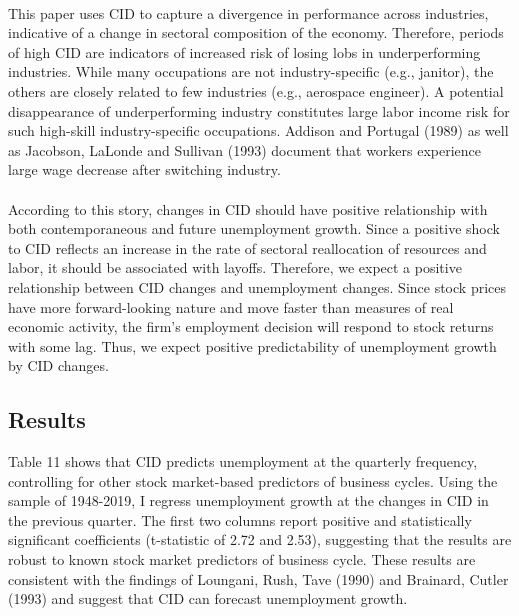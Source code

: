 \documentclass[12pt]{article}
\begin{document}
\paragraph{}
This paper uses CID to capture a divergence in performance across industries, indicative of a change in sectoral composition of the economy. Therefore, periods of high CID are indicators of increased risk of losing lobs in underperforming industries. While many occupations are not industry-specific (e.g., janitor), the others are closely related to few industries (e.g., aerospace engineer). A potential disappearance of underperforming industry constitutes large labor income risk for such high-skill industry-specific occupations. Addison and Portugal (1989) as well as Jacobson, LaLonde and Sullivan (1993) document that workers experience large wage decrease after switching industry. 
\paragraph{}
According to this story, changes in CID should have positive relationship with both contemporaneous and future unemployment growth. Since a positive shock to CID reflects an increase in the rate of sectoral reallocation of resources and labor, it should be associated with layoffs. Therefore, we expect a positive relationship between CID changes and unemployment changes. Since stock prices have more forward-looking nature and move faster than measures of real economic activity, the firm's employment decision will respond to stock returns with some lag. Thus, we expect positive predictability of unemployment growth by CID changes.

\subsection{Results}

Table 11 shows that CID predicts unemployment at the quarterly frequency, controlling for other stock market-based predictors of business cycles.
Using the sample of 1948-2019, I regress unemployment growth at the changes in CID in the previous quarter. The first two columns report positive and statistically significant coefficients (t-statistic of 2.72 and 2.53), suggesting that the results are robust to known stock market predictors of business cycle. These results are consistent with the findings of Loungani, Rush, Tave (1990) and Brainard, Cutler (1993) and suggest that CID can forecast unemployment growth. 
\end{document}
